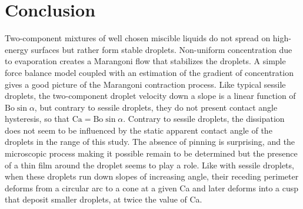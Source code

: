\documentclass[aps,prl,reprint,superscriptaddress,amsmath,amssymb,]{revtex4-1}
\begin{document}
\section*{Conclusion}
Two-component mixtures of well chosen miscible liquids do not spread on high-energy surfaces but rather form stable droplets. Non-uniform concentration due to evaporation creates a Marangoni flow that stabilizes the droplets. A simple force balance model coupled with an estimation of the gradient of concentration gives a good picture of the Marangoni contraction process. Like typical sessile droplets, the two-component droplet velocity down a slope is a linear function of $\mathrm{Bo} \sin{\alpha}$, but contrary to sessile droplets, they do not present contact angle hysteresis, so that $\mathrm{Ca}=\mathrm{Bo} \sin{\alpha}$. Contrary to sessile droplets, the dissipation does not seem to be influenced by the static apparent contact angle of the droplets in the range of this study. The absence of pinning is surprising, and the microscopic process making it possible remain to be determined but the presence of a thin film around the droplet seems to play a role. Like with sessile droplets, when these droplets run down slopes of increasing angle, their receding perimeter deforms from a circular arc to a cone at a given Ca and later deforms into a cusp that deposit smaller droplets, at twice the value of Ca.


\begin{acknowledgments}
  \end{acknowledgments}


\end{document}
